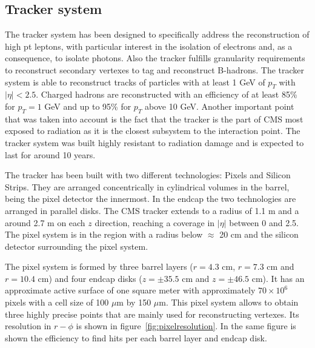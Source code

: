 \subsection{Tracker system}
\label{sec:tracker}

The tracker system has been designed to specifically address the reconstruction of high pt leptons, with particular interest in the isolation of electrons and, as a consequence, to isolate photons. Also the tracker fulfills granularity requirements to reconstruct secondary vertexes to tag and reconstruct B-hadrons. The tracker system is able to reconstruct tracks of particles with at least 1 GeV of $p_{T}$ with $|\eta|<2.5$. Charged hadrons are reconstructed with an efficiency of at least 85\% for $p_{T}=1$ GeV and up to 95\% for $p_{T}$ above 10 GeV. Another important point that was taken into account is the fact that the tracker is the part of CMS most exposed to radiation as it is the closest subsystem to the interaction point. The tracker system was built highly resistant to radiation damage and is expected to last for around 10 years. %

The tracker has been built with two different technologies: Pixels and Silicon Strips. They are arranged concentrically in cylindrical volumes in the barrel, being the pixel detector the innermost. In the endcap the two technologies are arranged in parallel disks. The CMS tracker extends to a radius of 1.1 m and a around 2.7 m on each $z$ direction, reaching a coverage in $|\eta|$ between 0 and 2.5. The pixel system is in the region with a radius below $\approx$ 20 cm and the silicon detector surrounding the pixel system. %

The pixel system is formed by three barrel layers ($r=4.3$ cm, $r=7.3$ cm and $r=10.4$ cm) and four endcap disks ($z=\pm 35.5$ cm and $z=\pm 46.5$ cm). It has an approximate active surface of one square meter with approximately $70\times10^{6}$ pixels with a cell size of 100 $\mu$m by 150 $\mu$m. This pixel system allows to obtain three highly precise points that are mainly used for reconstructing vertexes. Its resolution in $r-\phi$ is shown in figure~\ref{fig:pixelresolution}. In the same figure is shown the efficiency to find hits per each barrel layer and endcap disk. 

